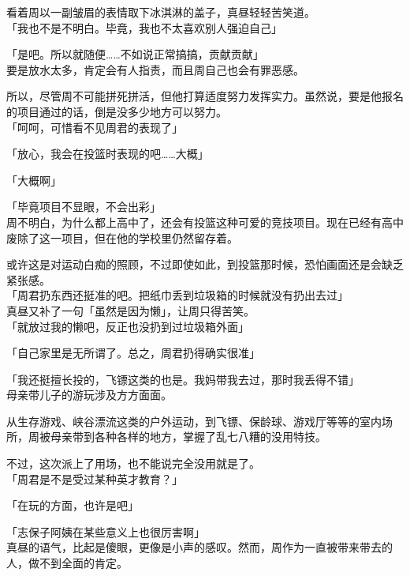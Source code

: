 看着周以一副皱眉的表情取下冰淇淋的盖子，真昼轻轻苦笑道。\\

「我也不是不明白。毕竟，我也不太喜欢别人强迫自己」

「是吧。所以就随便……不如说正常搞搞，贡献贡献」\\

要是放水太多，肯定会有人指责，而且周自己也会有罪恶感。

所以，尽管周不可能拼死拼活，但他打算适度努力发挥实力。虽然说，要是他报名的项目通过的话，倒是没多少地方可以努力。\\

「呵呵，可惜看不见周君的表现了」

「放心，我会在投篮时表现的吧……大概」

「大概啊」

「毕竟项目不显眼，不会出彩」\\

周不明白，为什么都上高中了，还会有投篮这种可爱的竞技项目。现在已经有高中废除了这一项目，但在他的学校里仍然留存着。

或许这是对运动白痴的照顾，不过即使如此，到投篮那时候，恐怕画面还是会缺乏紧张感。\\

「周君扔东西还挺准的吧。把纸巾丢到垃圾箱的时候就没有扔出去过」\\

真昼又补了一句「虽然是因为懒」，让周只得苦笑。\\

「就放过我的懒吧，反正也没扔到过垃圾箱外面」

「自己家里是无所谓了。总之，周君扔得确实很准」

「我还挺擅长投的，飞镖这类的也是。我妈带我去过，那时我丢得不错」\\

母亲带儿子的游玩涉及方方面面。

从生存游戏、峡谷漂流这类的户外运动，到飞镖、保龄球、游戏厅等等的室内场所，周被母亲带到各种各样的地方，掌握了乱七八糟的没用特技。

不过，这次派上了用场，也不能说完全没用就是了。\\

「周君是不是受过某种英才教育？」

「在玩的方面，也许是吧」

「志保子阿姨在某些意义上也很厉害啊」\\

真昼的语气，比起是傻眼，更像是小声的感叹。然而，周作为一直被带来带去的人，做不到全面的肯定。\\

